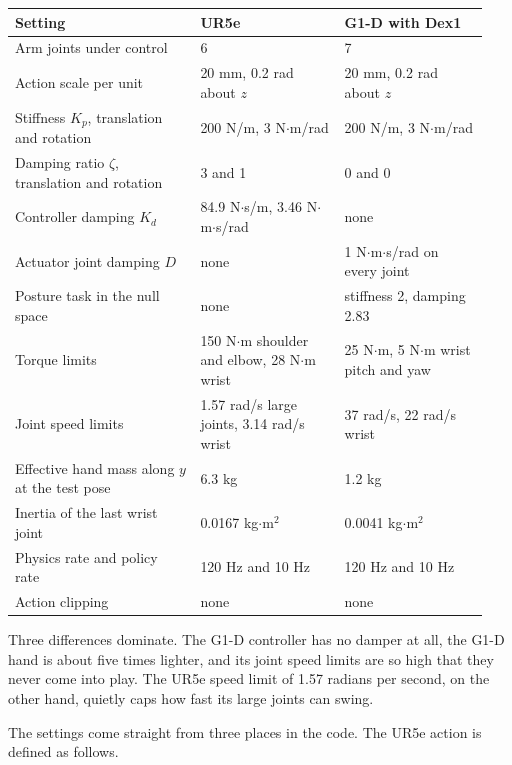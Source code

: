 \begin{mytable}
\small
\begin{tabular}{@{}p{0.36\linewidth}p{0.29\linewidth}p{0.29\linewidth}@{}}
\toprule
Setting & UR5e & G1-D with Dex1 \\
\midrule
Arm joints under control & 6 & 7 \\
Action scale per unit & 20 mm, 0.2 rad about $z$ & 20 mm, 0.2 rad about $z$ \\
Stiffness $K_p$, translation and rotation & 200 N/m, 3 N$\cdot$m/rad & 200 N/m, 3 N$\cdot$m/rad \\
\rowcolor{band} Damping ratio $\zeta$, translation and rotation & 3 and 1 & 0 and 0 \\
\rowcolor{band} Controller damping $K_d$ & 84.9 N$\cdot$s/m, 3.46 N$\cdot$m$\cdot$s/rad & none \\
\rowcolor{band} Actuator joint damping $D$ & none & 1 N$\cdot$m$\cdot$s/rad on every joint \\
\rowcolor{band} Posture task in the null space & none & stiffness 2, damping 2.83 \\
\rowcolor{band} Torque limits & 150 N$\cdot$m shoulder and elbow, 28 N$\cdot$m wrist & 25 N$\cdot$m, 5 N$\cdot$m wrist pitch and yaw \\
\rowcolor{band} Joint speed limits & 1.57 rad/s large joints, 3.14 rad/s wrist & 37 rad/s, 22 rad/s wrist \\
\rowcolor{band} Effective hand mass along $y$ at the test pose & 6.3 kg & 1.2 kg \\
\rowcolor{band} Inertia of the last wrist joint & 0.0167 kg$\cdot$m$^2$ & 0.0041 kg$\cdot$m$^2$ \\
Physics rate and policy rate & 120 Hz and 10 Hz & 120 Hz and 10 Hz \\
Action clipping & none & none \\
\bottomrule
\end{tabular}
\end{mytable}

Three differences dominate. The G1-D controller has no damper at all, the G1-D hand is about five times lighter, and its joint speed limits are so high that they never come into play. The UR5e speed limit of 1.57 radians per second, on the other hand, quietly caps how fast its large joints can swing.

The settings come straight from three places in the code. The UR5e action is defined as follows.

